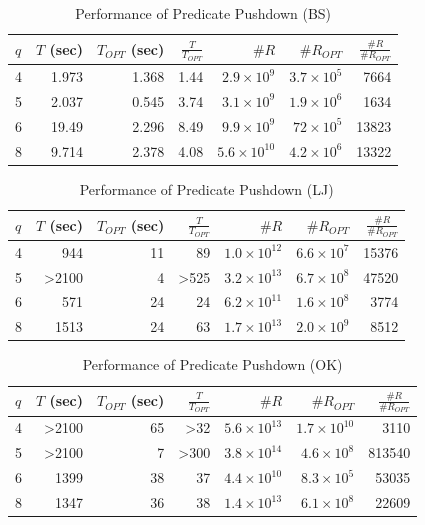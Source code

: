 \begin{table}
  \caption{Performance of Predicate Pushdown (BS)}\label{tab:pushdown_bs}
  \begin{tabular}{lrrrrrr}
    \toprule
    $q$ & \parbox{5mm}{$T$ (sec)} & \parbox{5mm}{$T_{OPT}$ (sec)} & $\frac{T}{T_{OPT}}$ & $\#R$ & $\#R_{OPT}$ & $\frac{\#R}{\#R_{OPT}}$ \\
     & 1.973 &     1.368 &     1.44 & $2.9 \times 10^9$ &        $3.7 \times 10 ^5$ &            7664 \\
    5 & 2.037 &     0.545 &     3.74 & $3.1 \times 10^9$ &   $1.9 \times 10^6$ &            1634 \\
    6 & 19.49 &     2.296 &     8.49 & $9.9 \times 10^9$ &        $72\times10^5$ &           13823 \\
    8 & 9.714 &     2.378 &     4.08 & $5.6 \times 10^{10}$ &   $4.2 \times 10^6$ &           13322 \\
    \bottomrule
  \end{tabular}
\end{table}

\begin{table}
  \caption{Performance of Predicate Pushdown (LJ)}\label{tab:pushdown_lj}
  \begin{tabular}{lrrrrrr}
    \toprule
    $q$ & \parbox{5mm}{$T$ (sec)} & \parbox{5mm}{$T_{OPT}$ (sec)} & $\frac{T}{T_{OPT}}$ & $\#R$ & $\#R_{OPT}$ & $\frac{\#R}{\#R_{OPT}}$ \\
     &   944 &        11 &       89 &   $1.0 \times 10^{12}$ &   $6.6 \times 10^7$ &     15376 \\
    5 & >2100 &         4 &     >525 &  $3.2 \times 10^{13}$  &   $6.7 \times 10^8$ &     47520 \\
    6 &   571 &        24 &       24 &   $6.2 \times 10^{11}$ &   $1.6 \times 10^8$ &      3774 \\
    8 &  1513 &        24 &       63 &   $1.7 \times 10^{13}$ &    $2.0 \times 10^9$ &      8512 \\
    \bottomrule
  \end{tabular}
\end{table}

\begin{table}
  \caption{Performance of Predicate Pushdown (OK)}\label{tab:pushdown_ok}
  \begin{tabular}{lrrrrrr}
    \toprule
    $q$ & \parbox{5mm}{$T$ (sec)} & \parbox{5mm}{$T_{OPT}$ (sec)} & $\frac{T}{T_{OPT}}$ & $\#R$ & $\#R_{OPT}$ & $\frac{\#R}{\#R_{OPT}}$ \\
     & >2100 &        65 &      >32 &  $5.6 \times 10^{13}$ &   $1.7 \times 10^{10}$ &      3110 \\
    5 & >2100 &         7 &     >300 &  $3.8 \times 10^{14}$ &     $4.6 \times 10^8$ &     813540 \\
    6 &  1399 &        38 &       37 &  $4.4 \times 10^{10}$ &     $8.3 \times 10^5$ &      53035 \\
    8 &  1347 &        36 &       38 &  $1.4 \times 10^{13}$ &     $6.1 \times 10^8$ &      22609 \\
    \bottomrule
  \end{tabular}
\end{table}
